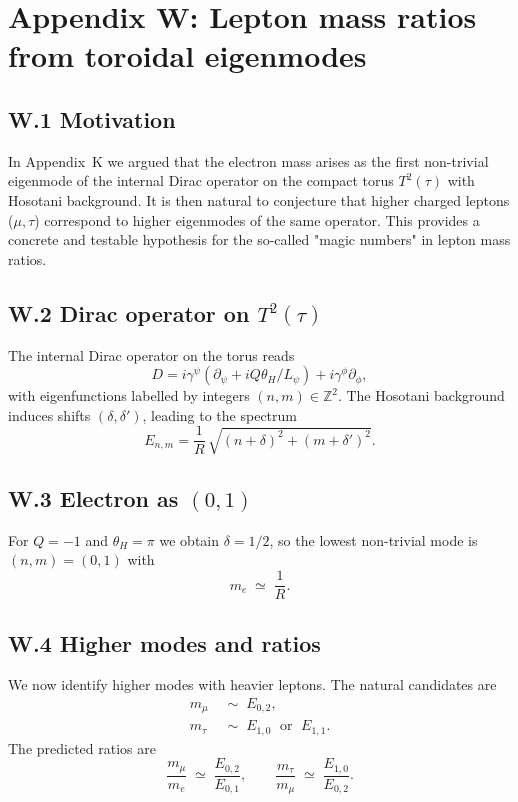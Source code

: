 
\appendix
\section*{Appendix W: Lepton mass ratios from toroidal eigenmodes}

\subsection*{W.1 Motivation}
In Appendix~K we argued that the electron mass arises as the first non-trivial
eigenmode of the internal Dirac operator on the compact torus $T^2(\tau)$ with
Hosotani background. It is then natural to conjecture that higher charged
leptons ($\mu,\tau$) correspond to higher eigenmodes of the same operator.
This provides a concrete and testable hypothesis for the so-called
"magic numbers" in lepton mass ratios.

\subsection*{W.2 Dirac operator on $T^2(\tau)$}
The internal Dirac operator on the torus reads
\begin{equation}
D = i\gamma^\psi \left(\partial_\psi + i Q \theta_H/L_\psi\right) 
  + i\gamma^\phi \partial_\phi ,
\end{equation}
with eigenfunctions labelled by integers $(n,m)\in\mathbb{Z}^2$.
The Hosotani background induces shifts $(\delta,\delta')$, leading to the
spectrum
\begin{equation}
E_{n,m} = \frac{1}{R}\,\sqrt{(n+\delta)^2+(m+\delta')^2}.
\end{equation}

\subsection*{W.3 Electron as $(0,1)$}
For $Q=-1$ and $\theta_H=\pi$ we obtain $\delta=1/2$, so the lowest non-trivial
mode is $(n,m)=(0,1)$ with
\begin{equation}
m_e \;\simeq\; \frac{1}{R}.
\end{equation}

\subsection*{W.4 Higher modes and ratios}
We now identify higher modes with heavier leptons.
The natural candidates are
\begin{align}
m_\mu &\;\sim\; E_{0,2}, \\
m_\tau &\;\sim\; E_{1,0} \;\text{ or }\; E_{1,1}.
\end{align}
The predicted ratios are
\begin{equation}
\frac{m_\mu}{m_e} \;\simeq\; \frac{E_{0,2}}{E_{0,1}}, \qquad
\frac{m_\tau}{m_\mu} \;\simeq\; \frac{E_{1,0}}{E_{0,2}}.
\end{equation}

